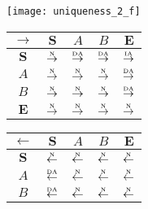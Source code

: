 \begin{figure}[htbp]
  \begin{subfigure}{1\textwidth}
    \vspace{1em}
    \centering
    \begin{minipage}[b]{1\textwidth}
      \centering
      \texttt{[image: uniqueness\_2\_f]}
    \end{minipage}
    \begin{minipage}[b]{0.3\textwidth}
      \vspace{1em}
      \centering
      \begin{tabular}{|c|c|c|c|c|} \hline
        $\rightarrow$ & $\bm{S}$ & $A$ & $B$ & $\bm{E}$\\ \hline
        $\bm{S}$ & $\overset{\text{\tiny{N}}}{\rightarrow}$ & $\overset{\text{\tiny{DA}}}{\rightarrow}$ & $\overset{\text{\tiny{DA}}}{\rightarrow}$ & $\overset{\text{\tiny{IA}}}{\rightarrow}$\\ \hline
        $A$ & $\overset{\text{\tiny{N}}}{\rightarrow}$ & $\overset{\text{\tiny{N}}}{\rightarrow}$ & $\overset{\text{\tiny{N}}}{\rightarrow}$ & $\overset{\text{\tiny{DA}}}{\rightarrow}$\\ \hline
        $B$ & $\overset{\text{\tiny{N}}}{\rightarrow}$ & $\overset{\text{\tiny{N}}}{\rightarrow}$ & $\overset{\text{\tiny{N}}}{\rightarrow}$ & $\overset{\text{\tiny{DA}}}{\rightarrow}$\\ \hline
        $\bm{E}$ & $\overset{\text{\tiny{N}}}{\rightarrow}$ & $\overset{\text{\tiny{N}}}{\rightarrow}$ & $\overset{\text{\tiny{N}}}{\rightarrow}$ & $\overset{\text{\tiny{N}}}{\rightarrow}$\\ \hline
      \end{tabular}
    \end{minipage}
    \begin{minipage}[b]{0.3\textwidth}
      \vspace{1em}
      \centering
      \begin{tabular}{|c|c|c|c|c|} \hline
        $\leftarrow$ & $\bm{S}$ & $A$ & $B$ & $\bm{E}$\\ \hline
        $\bm{S}$ & $\overset{\text{\tiny{N}}}{\leftarrow}$ & $\overset{\text{\tiny{N}}}{\leftarrow}$ & $\overset{\text{\tiny{N}}}{\leftarrow}$ & $\overset{\text{\tiny{N}}}{\leftarrow}$\\ \hline
        $A$ & $\overset{\text{\tiny{DA}}}{\leftarrow}$ & $\overset{\text{\tiny{N}}}{\leftarrow}$ & $\overset{\text{\tiny{N}}}{\leftarrow}$ & $\overset{\text{\tiny{N}}}{\leftarrow}$\\ \hline
        $B$ & $\overset{\text{\tiny{DA}}}{\leftarrow}$ & $\overset{\text{\tiny{N}}}{\leftarrow}$ & $\overset{\text{\tiny{N}}}{\leftarrow}$ & $\overset{\text{\tiny{N}}}{\leftarrow}$\\ \hline

\end{tabular}
\end{minipage}
\end{subfigure}
\end{figure}
